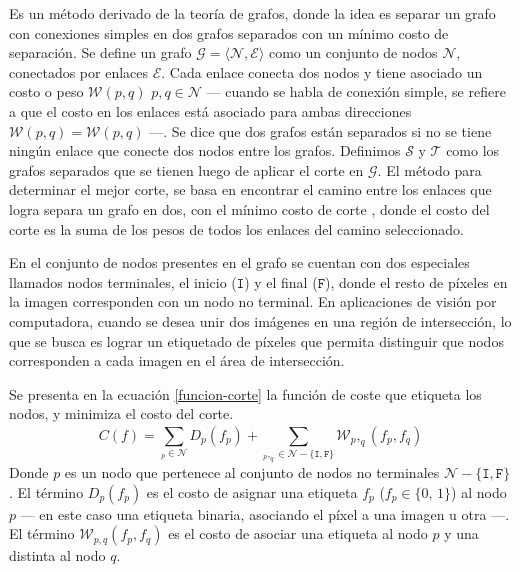 Es un método derivado de la teoría de grafos, donde la idea es separar un grafo con conexiones simples en dos grafos separados con un mínimo costo de separación. Se define un grafo $\mathcal{G} = \langle \mathcal{N}, \mathcal{E} \rangle$ como un conjunto de nodos $\mathcal{N}$, conectados por enlaces $\mathcal{E}$. Cada enlace conecta dos nodos y tiene asociado un costo o peso $\mathcal{W}(p, q) \,\, p,q \in \mathcal{N}$ --- cuando se habla de conexión simple, se refiere a que el costo en los enlaces está asociado para ambas direcciones $\mathcal{W}(p, q) = \mathcal{W}(p, q)$ ---. Se dice que dos grafos están separados si no se tiene ningún enlace que conecte dos nodos entre los grafos. Definimos $\mathcal{S}$ y $\mathcal{T}$ como los grafos separados que se tienen luego de aplicar el corte en $\mathcal{G}$. El método para determinar el mejor corte, se basa en encontrar el camino entre los enlaces que logra separa un grafo en dos, con el mínimo costo de corte \cite{graph-cut}, donde el costo del corte es la suma de los pesos de todos los enlaces del camino seleccionado.

En el conjunto de nodos presentes en el grafo se cuentan con dos especiales llamados nodos terminales, el inicio ($\mathtt{I}$) y el final ($\mathtt{F}$), donde el resto de píxeles en la imagen corresponden con un nodo no terminal. En aplicaciones de visión por computadora, cuando se desea unir dos imágenes en una región de intersección, lo que se busca es lograr un etiquetado de píxeles que permita distinguir que nodos corresponden a cada imagen en el área de intersección.

Se presenta en la ecuación \ref{funcion-corte} la función de coste que etiqueta los nodos, y minimiza el costo del corte.
\begin{equation}
C(f) = \sum_{_p\in \mathcal{N}}^{} D_p(f_p) + \sum_{_p,_q \in \mathcal{N} - \{\mathtt{I},\mathtt{F}\}}^{} \mathcal{W}_p,_q (f_p, f_q)
\label{funcion-corte}
\end{equation}
Donde $p$ es un nodo que pertenece al conjunto de nodos no terminales $\mathcal{N} - \{\mathtt{I},\mathtt{F}\}$. El término $D_p(f_p)$ es el costo de asignar una etiqueta $f_p$ ($f_p \in \{0,\,1\}$) al nodo $p$ --- en este caso una etiqueta binaria, asociando el píxel a una imagen u otra ---. El término $\mathcal{W}_{p,q} (f_p, f_q)$ es el costo de asociar una etiqueta al nodo $p$ y una distinta al nodo $q$.

